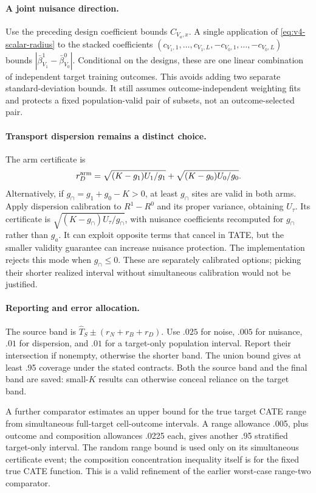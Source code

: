 \paragraph{A joint nuisance direction.}
Use the preceding design coefficient bounds $C_{V_a,x}$. A single application
of \eqref{eq:v4-scalar-radius} to the stacked coefficients
$(c_{V_1,1},\ldots,c_{V_1,L},-c_{V_0,1},\ldots,-c_{V_0,L})$ bounds
$|\bar\beta_{V_1}^1-\bar\beta_{V_0}^0|$. Conditional on the designs, these
are one linear combination of independent target training outcomes.
This avoids adding two separate standard-deviation bounds. It still assumes
outcome-independent weighting fits and protects a fixed population-valid
pair of subsets, not an outcome-selected pair.

\paragraph{Transport dispersion remains a distinct choice.}
The arm certificate is
\[
 r_D^{\rm arm}=\sqrt{(K-g_1)U_1/g_1}+\sqrt{(K-g_0)U_0/g_0}.
\]
Alternatively, if $g_\cap=g_1+g_0-K>0$, at least $g_\cap$ sites are valid in
both arms. Apply dispersion calibration to $R^1-R^0$ and its proper variance,
obtaining $U_\tau$. Its certificate is
$\sqrt{(K-g_\cap)U_\tau/g_\cap}$, with nuisance coefficients recomputed for
$g_\cap$ rather than $g_a$. It can exploit opposite terms that cancel in
TATE, but the smaller validity guarantee can increase nuisance protection.
The implementation rejects this mode when $g_\cap\le0$.
These are separately calibrated options; picking their shorter realized
interval without simultaneous calibration would not be justified.

\paragraph{Reporting and error allocation.}
The source band is $\hat T_S\pm(r_N+r_B+r_D)$. Use $.025$ for noise,
$.005$ for nuisance, $.01$ for dispersion, and $.01$ for a target-only
population interval. Report their intersection if nonempty, otherwise the
shorter band. The union bound gives at least .95 coverage under the stated
contracts. Both the source band and the final band are saved: small-$K$
results can otherwise conceal reliance on the target band.

A further comparator estimates an upper bound for the true target CATE range
from simultaneous full-target cell-outcome intervals. A range allowance .005,
plus outcome and composition allowances .0225 each, gives another .95
stratified target-only interval. The random range bound is used only on its
simultaneous certificate event; the composition concentration inequality itself
is for the fixed true CATE function. This is a valid refinement of the earlier
worst-case range-two comparator.
